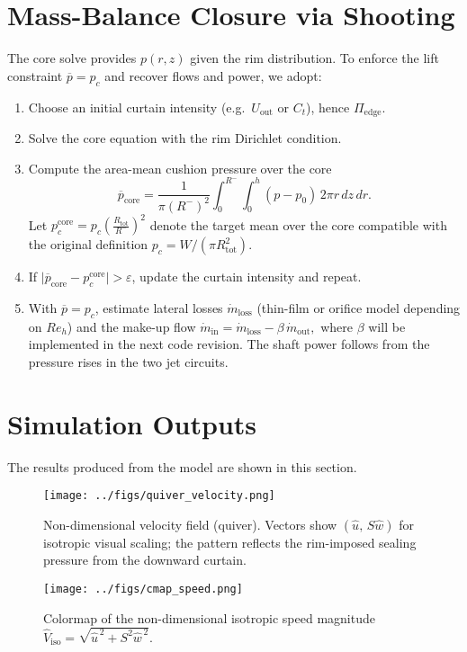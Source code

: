 \documentclass[11pt,a4paper]{article}
\begin{document}
\section{Mass-Balance Closure via Shooting}
\label{sec:shooting}
The core solve provides $p(r,z)$ given the rim distribution. To enforce the lift
constraint $\overline{p}=p_c$ and recover flows and power, we adopt:
\begin{enumerate}
  \item Choose an initial curtain intensity (e.g.\ $U_{\mathrm{out}}$ or $C_t$), hence
        $\Pi_{\mathrm{edge}}$.
  \item Solve the core equation with the rim Dirichlet condition.
  \item Compute the area-mean cushion pressure over the core
  \[
    \overline{p}_{\mathrm{core}}=\frac{1}{\pi (R^-)^2}
    \int_0^{R^{-}}\!\!\int_0^h (p-p_0)\,2\pi r\,dz\,dr.
  \]
  Let $p_c^{\mathrm{core}} = p_c \left(\frac{R_{\mathrm{tot}}}{R^-}\right)^2$ denote the
  target mean over the core compatible with the original definition
  $p_c=W/(\pi R_{\mathrm{tot}}^2)$.
  \item If $\big|\overline{p}_{\mathrm{core}}-p_c^{\mathrm{core}}\big|>\varepsilon$, update
  the curtain intensity and repeat.

  \item With $\overline{p}=p_c$, estimate lateral losses $\dot m_{\mathrm{loss}}$ (thin-film
  or orifice model depending on $Re_h$) and the make-up flow
  \(
    \dot m_{\mathrm{in}}=\dot m_{\mathrm{loss}}-\beta\,\dot m_{\mathrm{out}},
  \)
  where $\beta$ will be implemented in the next code revision. The shaft power follows
  from the pressure rises in the two jet circuits.
\end{enumerate}


\section{Simulation Outputs}
The results produced from the model are shown in this section.
\begin{figure}[H]
  \centering
  \texttt{[image: ../figs/quiver\_velocity.png]}
  \caption{Non-dimensional velocity field (quiver).
Vectors show $(\hat u,\,S\hat w)$ for isotropic visual scaling; the pattern reflects the rim-imposed sealing pressure from the downward curtain.}
  \label{fig:quiver}
\end{figure}

\begin{figure}[H]
  \centering
  \texttt{[image: ../figs/cmap\_speed.png]}
  \caption{Colormap of the non-dimensional isotropic speed magnitude $\hat V_{\mathrm{iso}}=\sqrt{\hat u^{\,2}+S^{2}\hat w^{\,2}}$.}
  \label{fig:cmap_speed}
\end{figure}
\end{document}
